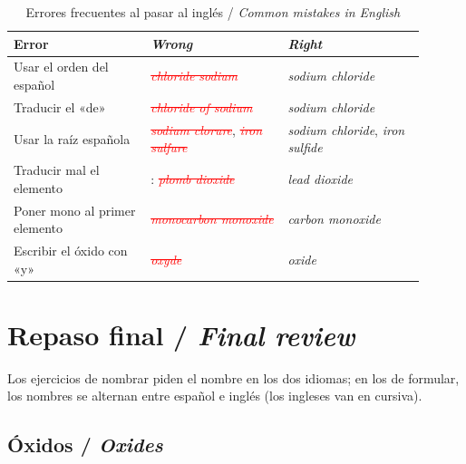 \documentclass[12pt]{article}
\theoremstyle{mygreennumbox}
\newcommand{\mal}[1]{\textcolor{red}{\sout{#1}}}
\newcommand{\en}[1]{\textit{#1}}
\begin{document}
\begin{table}[H]
    \centering
    \caption{Errores frecuentes al pasar al inglés / \en{Common mistakes in English}}
    \vspace{-5pt}
    \begin{tabular}{@{}L{0.3\linewidth} L{0.3\linewidth} L{0.3\linewidth}@{}}
        \toprule
        \textbf{Error} & \textbf{\en{Wrong}} & \textbf{\en{Right}} \\
        \midrule
        Usar el orden del español & \mal{\en{chloride sodium}} & \en{sodium chloride} \\[3pt]
        Traducir el «de» & \mal{\en{chloride of sodium}} & \en{sodium chloride} \\[3pt]
        Usar la raíz española & \mal{\en{sodium clorure}}, \mal{\en{iron sulfure}} & \en{sodium chloride}, \en{iron sulfide} \\[3pt]
        Traducir mal el elemento & : \mal{\en{plomb dioxide}} & \en{lead dioxide} \\[3pt]
        Poner mono al primer elemento & \mal{\en{monocarbon monoxide}} & \en{carbon monoxide} \\[3pt]
        Escribir el óxido con «y» & \mal{\en{oxyde}} & \en{oxide} \\
        \bottomrule
    \end{tabular}
    \label{tab:errores_en}
\end{table}

\newpage
\section{Repaso final / \en{Final review}}

Los ejercicios de nombrar piden el nombre en los dos idiomas; en los de formular, los nombres se alternan entre español e inglés (los ingleses van en cursiva).

\subsection{Óxidos / \en{Oxides}}
\end{document}

